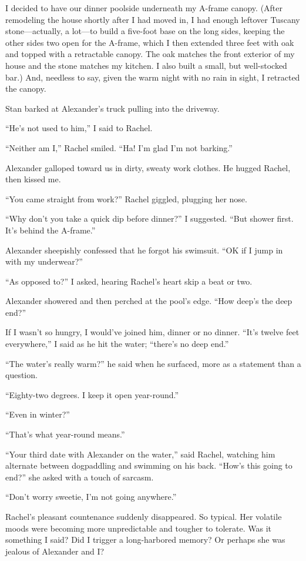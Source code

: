 I decided to have our dinner poolside underneath my A-frame canopy.
(After remodeling the house shortly after I had moved in, I had enough
leftover Tuscany stone---actually, a lot---to build a five-foot base on
the long sides, keeping the other sides two open for the A-frame, which
I then extended three feet with oak and topped with a retractable
canopy. The oak matches the front exterior of my house and the stone
matches my kitchen. I also built a small, but well-stocked bar.) And,
needless to say, given the warm night with no rain in sight, I retracted
the canopy.

Stan barked at Alexander's truck pulling into the driveway.

``He's not used to him,'' I said to Rachel.

``Neither am I,'' Rachel smiled. ``Ha! I'm glad I'm not barking.''

Alexander galloped toward us in dirty, sweaty work clothes. He hugged
Rachel, then kissed me.

``You came straight from work?'' Rachel giggled, plugging her nose.

``Why don't you take a quick dip before dinner?'' I suggested. ``But
shower first. It's behind the A-frame.''

Alexander sheepishly confessed that he forgot his swimsuit. ``OK if I
jump in with my underwear?''

``As opposed to?'' I asked, hearing Rachel's heart skip a beat or two.

Alexander showered and then perched at the pool's edge. ``How deep's the
deep end?''

If I wasn't so hungry, I would've joined him, dinner or no dinner.
``It's twelve feet everywhere,'' I said as he hit the water; ``there's
no deep end.''

``The water's really warm?'' he said when he surfaced, more as a
statement than a question.

``Eighty-two degrees. I keep it open year-round.''

``Even in winter?''

``That's what year-round means.''

``Your third date with Alexander on the water,'' said Rachel, watching
him alternate between dogpaddling and swimming on his back. ``How's this
going to end?'' she asked with a touch of sarcasm.

``Don't worry sweetie, I'm not going anywhere.''

Rachel's pleasant countenance suddenly disappeared. So typical. Her
volatile moods were becoming more unpredictable and tougher to tolerate.
Was it something I said? Did I trigger a long-harbored memory? Or
perhaps she was jealous of Alexander and I?

